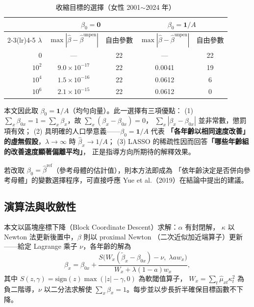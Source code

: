 \documentclass[UTF8, fontset=macnew, a4paper, 12pt]{ctexart}
\begin{document}
\begin{table}[H]
\centering
\caption{收縮目標的選擇（女性 2001$\sim$2024 年）}
\small
\begin{tabular}{rcccc}
\toprule
& \multicolumn{2}{c}{$\beta_0=\mathbf{0}$} & \multicolumn{2}{c}{$\beta_0=\mathbf{1}/A$}\\
\cmidrule(lr){2-3}\cmidrule(lr){4-5}
$\lambda$ & $\max|\hat\beta-\hat\beta^{\text{unpen}}|$ & 自由參數 &
            $\max|\hat\beta-\hat\beta^{\text{unpen}}|$ & 自由參數\\
\midrule
$0$      & --- & 22 & --- & 22\\
$10^2$   & $9.0\times10^{-17}$ & 22 & 0.0041 & 19\\
$10^4$   & $1.5\times10^{-16}$ & 22 & 0.0612 & 6\\
$10^6$   & $2.1\times10^{-15}$ & 22 & 0.0612 & 0\\
\bottomrule
\end{tabular}
\label{tab:shrink}
\end{table}

本文因此取 $\beta_0=\mathbf{1}/A$（均勻向量）。此一選擇有三項優點：
(1) $\sum_x\beta_{0x}=1=\sum_x\beta_x$，故 $\sum_x(\beta_x-\beta_{0x})=0$，
$\sum_x|\beta_x-\beta_{0x}|$ 並非常數，懲罰項有效；
(2) 具明確的人口學意義——$\beta_0=\mathbf{1}/A$ 代表
\textbf{「各年齡以相同速度改善」的虛無假設}，$\lambda\to\infty$ 時
$\hat\beta_x\to1/A$；
(3) LASSO 的稀疏性因而回答\textbf{「哪些年齡組的改善速度顯著偏離平均」}，
正是指導方向所期待的解釋效果。

若改取 $\beta_0=\hat\beta^{\text{ref}}$（參考母體的估計值），則本方法即成為
「依年齡決定是否併向參考母體」的變數選擇程序，可直接呼應
Yue et al.（2019）在結論中提出的建議。

\subsection{演算法與收斂性}

本文以區塊座標下降（Block Coordinate Descent）求解：$\alpha$ 有封閉解，
$\kappa$ 以 Newton 法更新後置中，$\beta$ 則以 proximal Newton
（二次近似加近端算子）更新——給定 Lagrange 乘子 $\nu$，各年齡的解為
\begin{equation}
\beta_x=\beta_{0x}+\frac{S\big(W_x(\tilde\beta_x-\beta_{0x})-\nu,\;
\lambda a w_x\big)}{W_x+\lambda(1-a)w_x},
\end{equation}
其中 $S(z,\gamma)=\mathrm{sign}(z)\max(|z|-\gamma,0)$ 為軟閾值算子，
$W_x=\sum_t\hat\mu_{xt}\kappa_t^2$ 為負二階導，$\nu$ 以二分法求解使
$\sum_x\beta_x=1$。每步並以步長折半確保目標函數不下降。
\end{document}
